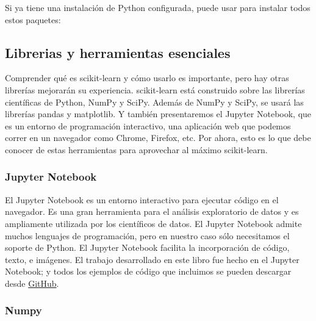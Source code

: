 Si ya tiene una instalación de Python configurada, puede usar {} para instalar todos estos
paquetes:


	{\footnotesize \bf { }}


\subsection{Librerias y herramientas esenciales}

Comprender qué es {\ttfamily  scikit-learn} y cómo usarlo es importante, pero hay  otras librerías mejorarán su experiencia. scikit-learn está construido sobre las librerías científicas de {\ttfamily Python, NumPy} y  {\ttfamily SciPy}.    Además de  {\ttfamily NumPy} y  {\ttfamily SciPy}, se usará las librerías  {\ttfamily pandas} y  {\ttfamily matplotlib}. Y también presentaremos el {\ttfamily Jupyter Notebook}, que es un entorno de programación interactivo, una aplicación web que podemos correr en un navegador como Chrome, Firefox, etc.
 Por ahora, esto es lo que  debe conocer de estas herramientas para aprovechar al máximo {\ttfamily  scikit-learn}.



\subsubsection{Jupyter Notebook}

El Jupyter Notebook  es un entorno interactivo para ejecutar código en el navegador.
Es una gran herramienta para el análisis exploratorio de datos y es ampliamente utilizada por los científicos de datos. El Jupyter Notebook  admite muchos lenguajes de programación, pero en nuestro caso  sólo necesitamos el soporte de Python. El Jupyter Notebook  facilita la incorporación de código, texto,
e imágenes. El trabajo desarrollado en este libro fue  hecho en el Jupyter Notebook; y todos los ejemplos de código que incluimos se pueden descargar desde \href{https://github.com/amueller/introduction_to_ml_with_python}{\color{vino} GitHub}.


\subsubsection{Numpy}           %
 
